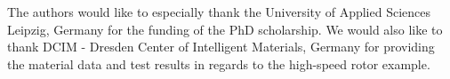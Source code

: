 The authors would like to especially thank the University of Applied Sciences Leipzig, Germany
for the funding of the PhD scholarship.
We would also like to  thank DCIM - Dresden Center of Intelligent Materials, Germany
for providing the material data and test results in regards to the high-speed rotor example.